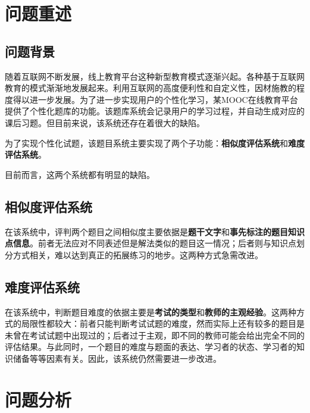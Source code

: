 \setcounter{page}{1}    %

%
%

\section{问题重述}

\subsection{问题背景}

随着互联网不断发展，线上教育平台这种新型教育模式逐渐兴起。各种基于互联网教育的模式渐渐地发展起来。利用互联网的高度便利性和自定义性，因材施教的程度得以进一步发展。为了进一步实现用户的个性化学习，某\linebreak MOOC在线教育平台提供了个性化题库的功能。该题库系统会记录用户的学习过程，并自动生成对应的课后习题。但目前来说，该系统还存在着很大的缺陷。

为了实现个性化试题，该题目系统主要实现了两个子功能：\textbf{相似度评估系统}和\textbf{难度评估系统}。

目前而言，这两个系统都有明显的缺陷。

\subsection{相似度评估系统}

在该系统中，评判两个题目之间相似度主要依据是\textbf{题干文字}和\textbf{事先标注的题目知识点信息}。前者无法应对不同表述但是解法类似的题目这一情况；后者则与知识点划分方式相关，难以达到真正的拓展练习的地步。这两种方式急需改进。

\subsection{难度评估系统}

在该系统中，判断题目难度的依据主要是\textbf{考试的类型}和\textbf{教师的主观经验}。这两种方式的局限性都较大：前者只能判断考试试题的难度，然而实际上还有较多的题目是未曾在考试试题中出现过的；后者过于主观，即不同的教师可能会给出完全不同的评估结果。与此同时，一个题目的难度与题面的表达、学习者的状态、学习者的知识储备等等因素有关。因此，该系统仍然需要进一步改进。

\section{问题分析}

